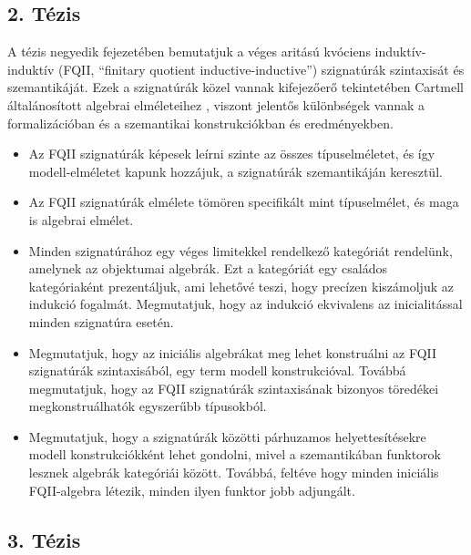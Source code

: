\documentclass[12pt,a4paper,twosided]{article}
\begin{document}
\subsection*{2. Tézis}

A tézis negyedik fejezetében bemutatjuk a véges aritású kvóciens
induktív-induktív (FQII, ``finitary quotient inductive-inductive'') szignatúrák
szintaxisát és szemantikáját. Ezek a szignatúrák közel vannak kifejezőerő
tekintetében Cartmell általánosított algebrai elméleteihez \cite{gat}, viszont
jelentős különbségek vannak a formalizációban és a szemantikai konstrukciókban
és eredményekben.
\begin{itemize}
\item Az FQII szignatúrák képesek leírni szinte az összes típuselméletet,
      és így modell-elméletet kapunk hozzájuk, a szignatúrák szemantikáján
      keresztül.
\item Az FQII szignatúrák elmélete tömören specifikált mint típuselmélet, és
      maga is algebrai elmélet.
\item
      Minden szignatúrához egy véges limitekkel rendelkező kategóriát rendelünk,
      amelynek az objektumai algebrák. Ezt a kategóriát egy családos
      kategóriaként \cite{cwfs} prezentáljuk, ami lehetővé teszi, hogy precízen
      kiszámoljuk az indukció fogalmát. Megmutatjuk, hogy az indukció ekvivalens
      az inicialitással minden szignatúra esetén.
\item
     Megmutatjuk, hogy az iniciális algebrákat meg lehet konstruálni az FQII
     szignatúrák szintaxisából, egy term modell konstrukcióval. Továbbá
     megmutatjuk, hogy az FQII szignatúrák szintaxisának bizonyos töredékei
     megkonstruálhatók egyszerűbb típusokból.
\item
     Megmutatjuk, hogy a szignatúrák közötti párhuzamos helyettesítésekre modell
     konstrukciókként lehet gondolni, mivel a szemantikában funktorok lesznek
     algebrák kategóriái között.  Továbbá, feltéve hogy minden iniciális
     FQII-algebra létezik, minden ilyen funktor jobb adjungált.
\end{itemize}

\subsection*{3. Tézis}
\end{document}
